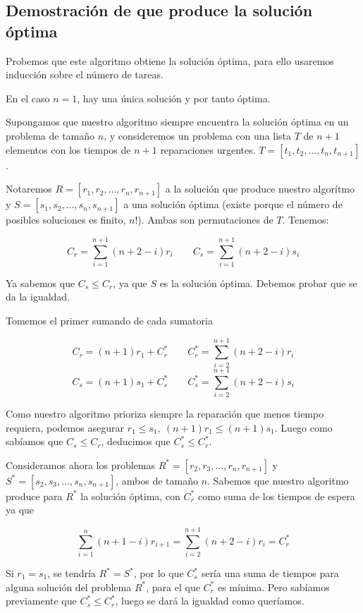 \documentclass[a4]{article}
\begin{document}
\subsection{Demostración de que produce la solución óptima}

Probemos que este algoritmo obtiene la solución óptima, para ello
usaremos inducción sobre el número de tareas.

En el caso $n=1$, hay una única solución y por tanto óptima.

Supongamos que nuestro algoritmo siempre encuentra la solución óptima
en un problema de tamaño $n$, y consideremos un problema con una
lista $T$ de $n+1$ elementos con los tiempos de $n+1$ reparaciones
urgentes.  $T=[t_1,t_2,\ldots,t_n,t_{n+1}]$.

Notaremos $R=[r_1,r_2,\ldots,r_n,r_{n+1}]$ a la solución que produce
nuestro algorítmo y $S=[s_1,s_2,\ldots,s_n,s_{n+1}]$ a una solución
óptima (existe porque el número de posibles soluciones es finito,
$n!$). Ambas son permutaciones de $T$. Tenemos: \vspace{-4mm}

\[C_r = \sum_{i=1}^{n+1} (n+2-i)r_i \qquad C_s = \sum_{i=1}^{n+1} (n+2-i)s_i\]

Ya sabemos que $C_s \leq C_r$, ya que $S$ es la solución
óptima. Debemos probar que se da la igualdad.

Tomemos el primer sumando de cada sumatoria

\[C_r = (n+1)r_1 + C_r^* \qquad C_r^* = \sum_{i=2}^{n+1}(n+2-i)r_i\]
\[C_s = (n+1)s_1 + C_s^* \qquad C_s^* = \sum_{i=2}^{n+1}(n+2-i)s_i\]

Como nuestro algoritmo prioriza siempre la reparación que menos tiempo
requiera, podemos asegurar $r_1 \leq s_1, \ (n+1)r_1 \leq
(n+1)s_1$. Luego como sabíamos que $C_s \leq C_r$, deducimos que
$C_s^* \leq C_r^*$.

Consideramos ahora los problemas $R^*=[r_2,r_3,\ldots,r_n,r_{n+1}]$ y
$S^*=[s_2,s_3,\ldots,s_n,s_{n+1}]$, ambos de tamaño $n$. Sabemos que
nuestro algoritmo produce para $R^*$ la solución óptima, con $C^*_r$
como suma de los tiempos de espera ya que 

\[\sum_{i=1}^n(n+1-i)r_{i+1} = \sum_{i=2}^{n+1}(n+2-i)r_i = C^*_r\]

Si $r_1=s_1$, se tendría $R^*=S^*$, por lo que $C_s^*$ sería una suma
de tiempos para alguna solución del problema $R^*$, para el que $C_r^*$
es mínima. Pero sabíamos previamente que $C_s^* \leq C_r^*$, luego se
dará la igualdad como queríamos.
\end{document}

